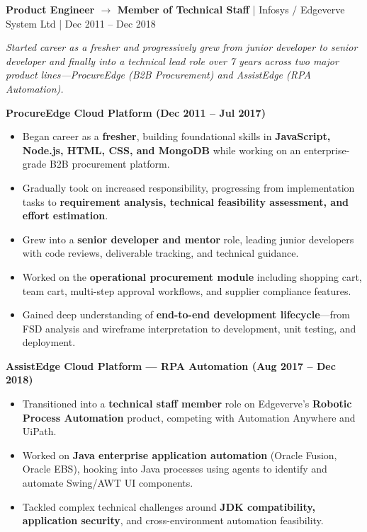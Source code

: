 \documentclass[a4paper,11pt]{article}
\newcommand{\jobtitle}[4]{
  \vspace{6pt}
  {\textbf{\textcolor{accent}{#1}} | #2 | #3}
  \vspace{2pt}
}
\begin{document}
\vspace{8pt}
\jobtitle{Product Engineer $\rightarrow$ Member of Technical Staff}{Infosys / Edgeverve System Ltd}{Dec 2011 -- Dec 2018}{}

\textit{Started career as a fresher and progressively grew from junior developer to senior developer and finally into a technical lead role over 7 years across two major product lines---ProcureEdge (B2B Procurement) and AssistEdge (RPA Automation).}

\vspace{4pt}
\textbf{ProcureEdge Cloud Platform (Dec 2011 -- Jul 2017)}
\begin{itemize}[leftmargin=*, nosep]
  \item Began career as a \textbf{fresher}, building foundational skills in \textbf{JavaScript, Node.js, HTML, CSS, and MongoDB} while working on an enterprise-grade B2B procurement platform.
  \item Gradually took on increased responsibility, progressing from implementation tasks to \textbf{requirement analysis, technical feasibility assessment, and effort estimation}.
  \item Grew into a \textbf{senior developer and mentor} role, leading junior developers with code reviews, deliverable tracking, and technical guidance.
  \item Worked on the \textbf{operational procurement module} including shopping cart, team cart, multi-step approval workflows, and supplier compliance features.
  \item Gained deep understanding of \textbf{end-to-end development lifecycle}---from FSD analysis and wireframe interpretation to development, unit testing, and deployment.
\end{itemize}

\vspace{4pt}
\textbf{AssistEdge Cloud Platform --- RPA Automation (Aug 2017 -- Dec 2018)}
\begin{itemize}[leftmargin=*, nosep]
  \item Transitioned into a \textbf{technical staff member} role on Edgeverve's \textbf{Robotic Process Automation} product, competing with Automation Anywhere and UiPath.
  \item Worked on \textbf{Java enterprise application automation} (Oracle Fusion, Oracle EBS), hooking into Java processes using agents to identify and automate Swing/AWT UI components.
  \item Tackled complex technical challenges around \textbf{JDK compatibility, application security}, and cross-environment automation feasibility.
\end{itemize}
\end{document}
